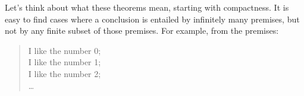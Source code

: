 







\iffalse

Let's think about what these theorems mean,
starting with compactness.
It is easy to find cases where
a conclusion is entailed by infinitely many premises,
but not by any finite subset of those premises.
For example,
from the premises:

\begin{quote}
  I like the number 0;\\
  I like the number 1;\\
  I like the number 2;\\
  \ldots
\end{quote}

